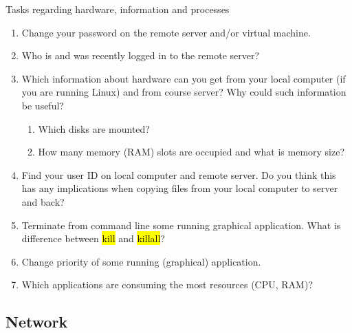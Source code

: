 \documentclass[compress, ucs, xelatex, 11pt, xcolor=svgnames, aspectratio=169,
	hyperref={
		bookmarks=true,
		unicode=true,
		colorlinks=true,
		pdftitle={Linux, command line and MetaCentrum},
		plainpages=false,
		pdfauthor={Vojtech Zeisek},
		pdfsubject={Course about use of Linux command line, writing shell scripts and using MetaCentrum of CESNET},
		pdfcreator={XeLaTeX},
		pdfkeywords={Linux, GNU, BASH, shell, command line, MetaCentrum},
		linkcolor=DarkRed, %
		anchorcolor=DarkBlue, %
		citecolor=Indigo, %
		filecolor=NavyBlue, %
		menucolor=DarkMagenta, %
		urlcolor=DarkBlue, %
		pdftex},
	url={hyphens, lowtilde} %
	]{beamer}
\renewcommand{\texttt}[1]{\hl{\ttfamily #1}}
\begin{document}
\begin{frame}{Tasks regarding hardware, information and processes}
	\begin{enumerate}
		\item Change your password on the remote server and/or virtual machine.
		\item Who is and was recently logged in to the remote server?
		\item Which information about hardware can you get from your local computer (if you are running Linux) and from course server? Why could such information be useful?
	\begin{enumerate}
		\item Which disks are mounted?
		\item How many memory (RAM) slots are occupied and what is memory size?
	\end{enumerate}
	\item Find your user ID on local computer and remote server. Do you think this has any implications when copying files from your local computer to server and back?
	\item Terminate from command line some running graphical application. What is difference between \texttt{kill} and \texttt{killall}?
	\item Change priority of some running (graphical) application.
	\item Which applications are consuming the most resources (CPU, RAM)?
	\end{enumerate}
\end{frame}

\subsection{Network}
\end{document}
